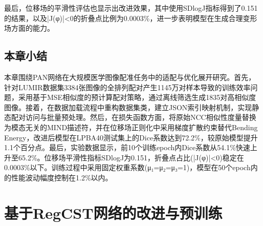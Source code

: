 最后，位移场的平滑性评估也显示出改进效果，其中使用SDlogJ指标得到了0.151的结果，以及|J(φ)|<0的折叠点比例为0.0003\%，进一步表明模型在生成合理变形场方面的能力。


\section{本章小结}

本章围绕PAN网络在大规模医学图像配准任务中的适配与优化展开研究。首先，针对LUMIR数据集3384张图像的全排列配对产生1145万对样本导致的训练效率问题，采用基于MSE相似度的预计算配对策略，通过离线筛选生成1835对高相似度图像。接着，在数据加载流程中重构数据集类，建立JSON索引映射机制，实现静态配对访问与批量预处理。然后，在损失函数方面，将原始NCC相似性度量替换为模态无关的MIND描述符，并在位移场正则化中采用梯度扩散约束替代Bending Energy，改进后模型在LPBA40测试集上的Dice系数达到72.2\%，较原始模型提升1.1个百分点。最后，实验数据显示，前10个训练epoch内Dice系数从54.1\%快速上升至65.2\%。位移场平滑性指标SDlogJ为0.151，折叠点占比(|J(φ)|<0)稳定在0.0003\%以下。训练过程中采用固定权重系数(μ₁=μ₂=μ₃=1)，模型在50个epoch内的性能波动幅度控制在1.2\%以内。

\chapter{基于RegCST网络的改进与预训练}





